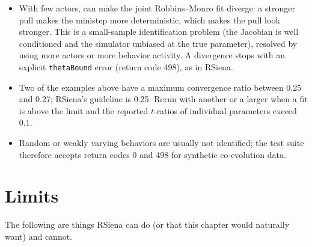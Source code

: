 \begin{itemize}[nosep]
\item With few actors,  can make the joint Robbins--Monro fit diverge: a stronger pull makes the ministep more deterministic, which makes the pull look stronger. This is a small-sample identification problem (the Jacobian is well conditioned and the simulator unbiased at the true parameter), resolved by using more actors or more behavior activity. A divergence stops with an explicit \texttt{thetaBound} error (return code 498), as in RSiena.
\item Two of the examples above have a maximum convergence ratio between 0.25 and 0.27; RSiena's guideline is 0.25. Rerun with another  or a larger  when a fit is above the limit and the reported $t$-ratios of individual parameters exceed 0.1.
\item Random or weakly varying behaviors are usually not identified; the test suite therefore accepts return codes 0 and 498 for synthetic co-evolution data.
\end{itemize}

\section{Limits}\label{sec:coev-limits}

The following are things RSiena can do (or that this chapter would naturally want) and \nwsaom{} cannot.

